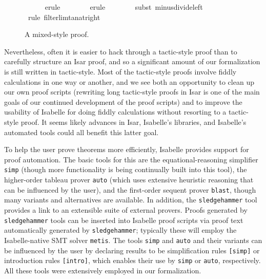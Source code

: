 \documentclass[leqno]{article}
\theoremstyle{definition}
\begin{document}
\begin{figure}
\begin{isabellebody}
\ \ \ \ \isamarkupfalse%
\ {\isacharparenleft}erule\ {\isacharparenleft}{}{\isacharparenright}\ {}{\isacharparenright}\isanewline
\ \ \ \ \isamarkupfalse%
\ {\isacharparenleft}erule\ {\isacharparenleft}{}{\isacharparenright}\ {}{\isacharparenright}\isanewline
\ \ \ \ \isamarkupfalse%
\ {\isacharparenleft}subst\ minus{\isacharunderscore}divide{\isacharunderscore}left{\isacharparenright}{\isacharplus}\isanewline
\ \ \ \ \isamarkupfalse%
\ {\isacharparenleft}rule\ filterlim{\isacharunderscore}tan{\isacharunderscore}at{\isacharunderscore}right{\isacharparenright}\isanewline
{}\isamarkupfalse%
\end{isabellebody}
\caption{A mixed-style proof.}
\label{fig:mix}
\end{figure}

Nevertheless, often it is easier to hack through a tactic-style proof than to carefully structure an Isar proof, and so a significant amount of our formalization is still written in tactic-style. Most of the tactic-style proofs involve fiddly calculations in one way or another, and we see both an opportunity to clean up our own proof scripts (rewriting long tactic-style proofs in Isar is one of the main goals of our continued development of the proof scripts) and to improve the usability of Isabelle for doing fiddly calculations without resorting to a tactic-style proof. It seems likely advances in Isar, Isabelle's libraries, and Isabelle's automated tools could all benefit this latter goal.

To help the user prove theorems more efficiently, Isabelle provides support for proof automation. The basic tools for this are the equational-reasoning simplifier \texttt{simp} (though more functionality is being continually built into this tool), the higher-order tableau prover \texttt{auto} (which uses extensive heuristic reasoning that can be influenced by the user), and the first-order sequent prover \texttt{blast}, though many variants and alternatives are available. In addition, the \texttt{sledgehammer} tool \cite{paulson-sledgehammer} provides a link to an extensible suite of external provers. Proofs generated by \texttt{sledgehammer} tools can be inserted into Isabelle proof scripts via proof text automatically generated by \texttt{sledgehammer}; typically these will employ the Isabelle-native SMT solver \texttt{metis}. The tools \texttt{simp} and \texttt{auto} and their variants can be influenced by the user by declaring results to be simplification rules \texttt{[simp]} or introduction rules \texttt{[intro]}, which enables their use by \texttt{simp} or \texttt{auto}, respectively. All these tools were extensively employed in our formalization.
\end{document}
